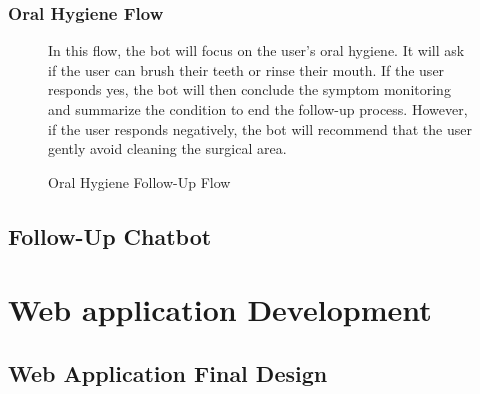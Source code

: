 \documentclass[12pt,oneside,openright,a4paper]{cpe-english-project}
\begin{document}
        \subsubsection{Oral Hygiene Flow}
          \begin{figure}[!h]
            \centering
            \caption{Oral Hygiene Follow-Up Flow}\label{fig:FollowUpFlow6}
            \begin{flushleft}
              \qquad In this flow, the bot will focus on the user's oral hygiene. It will ask if the user can brush their teeth or rinse their mouth. If the user responds yes, the bot will then conclude the symptom monitoring and summarize the condition to end the follow-up process. However, if the user responds negatively, the bot will recommend that the user gently avoid cleaning the surgical area.\par
            \end{flushleft}        
          \end{figure}
      \subsection{Follow-Up Chatbot}
  
    \section{Web application Development}
      \subsection{Web Application Final Design}
\end{document}
